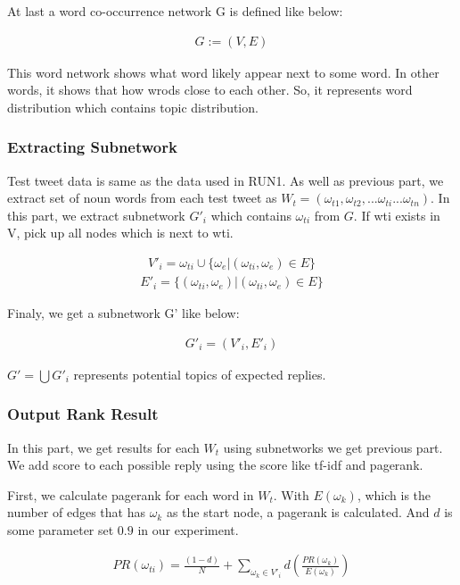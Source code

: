 \documentclass{../style/sig-alternate}
\begin{document}
At last a word co-occurrence network G is defined like below:

\begin{eqnarray}
G := (V,E)
\end{eqnarray}

This word network shows what word likely appear next to some word. In other words, it shows that how wrods close to each other. So, it represents word distribution which contains topic distribution.

\subsubsection{Extracting Subnetwork}
Test tweet data is same as the data used in RUN1. As well as previous part, we extract set of noun words from each test tweet as \(W_{t} = (\omega_{t1}, \omega_{t2}, ... \omega_{ti} ... \omega_{tn})\).
In this part, we extract subnetwork $G'_{i}$ which contains \(\omega_{ti}\) from $G$.
If wti exists in V, pick up all nodes which is next to wti.

\begin{eqnarray}V'_{i} = \omega_{ti} \cup \{\omega_{e} |  (\omega_{ti}, \omega_{e}) \in E\}\end{eqnarray}
\begin{eqnarray}E'_{i} = \{(\omega_{ti}, \omega_{e}) | (\omega_{ti}, \omega_{e}) \in E\} \end{eqnarray}

Finaly, we get a subnetwork G' like below:

\begin{eqnarray}G'_{i} = (V'_{i}, E'_{i})\end{eqnarray}

\(G' = \bigcup G'_{i}\) represents potential topics of expected replies.

\subsubsection{Output Rank Result}
In this part, we get results for each $W_{t}$ using subnetworks we get previous part. We add score to each possible reply using the score like tf-idf and pagerank\cite{pagerank}.

First, we calculate pagerank for each word in $W_{t}$. With $E(\omega_{k})$, which is the number of edges that has $\omega_{k}$ as the start node, a pagerank is calculated. And $d$ is some parameter set $0.9$ in our experiment.

\begin{eqnarray}PR(\omega_{ti}) = \frac{(1-d)}{N} + \sum_{\omega_{k}\in V'_{i}} d(\frac{PR(\omega_{k})}{E(\omega_{k})})\end{eqnarray}
\end{document}
